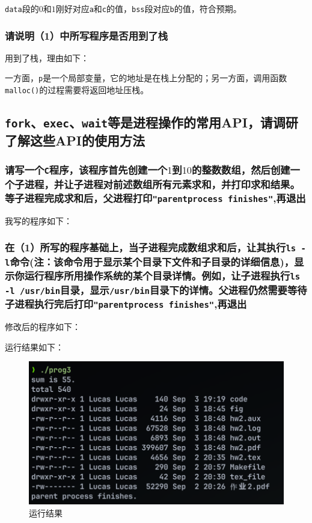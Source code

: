 \noindent
{\tt data}段的$0$和$1$刚好对应{\tt a}和{\tt c}的值，{\tt bss}段对应{\tt b}的值，符合预期。

\subsubsection{
    请说明（1）中所写程序是否用到了栈
}

\noindent
用到了栈，理由如下：

一方面，{\tt p}是一个局部变量，它的地址是在栈上分配的；另一方面，调用函数{\tt malloc()}的过程需要将返回地址压栈。

\subsection{
    {\tt fork}、{\tt exec}、{\tt wait}等是进程操作的常用API，请调研了解这些API的使用方法
}

\subsubsection{
    请写一个{\tt C}程序，该程序首先创建一个$1$到$10$的整数数组，然后创建一个子进程，并让子进程对前述数组所有元素求和，并打印求和结果。等子进程完成求和后，父进程打印{\tt "parentprocess finishes"},再退出
}

\noindent
我写的程序如下：



\subsubsection{
    在（1）所写的程序基础上，当子进程完成数组求和后，让其执行{\tt ls -l}命令(注：该命令用于显示某个目录下文件和子目录的详细信息)，显示你运行程序所用操作系统的某个目录详情。例如，让子进程执行{\tt ls -l /usr/bin}目录，显示{\tt /usr/bin}目录下的详情。父进程仍然需要等待子进程执行完后打印{\tt "parentprocess finishes"},再退出
}

\noindent
修改后的程序如下：



\noindent
运行结果如下：

\begin{figure}[H]
    \centering
    \includegraphics[width=1\textwidth]{fig/ls.png}
    \caption{运行结果}
\end{figure}

